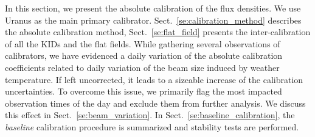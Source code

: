 
In this section, we present the absolute calibration of the flux densities. We
use Uranus as the main primary calibrator. Sect.~\ref{se:calibration_method}
describes the absolute calibration method, Sect.~\ref{se:flat_field} presents
the inter-calibration of all the KIDs and the flat fields. While
gathering several observations of calibrators, we have evidenced a
daily variation of the absolute calibration
coefficients related to daily variation of the beam
size induced by weather temperature. If left uncorrected, it leads to
a sizeable increase of the calibration uncertainties. To
overcome this issue, we primarily flag the most impacted observation
times of the day and exclude them from further analysis.
We discuss this effect in
Sect.~\ref{se:beam_variation}. In Sect.~\ref{se:baseline_calibration},
the \emph{baseline} calibration procedure is summarized and stability
tests are performed.  

